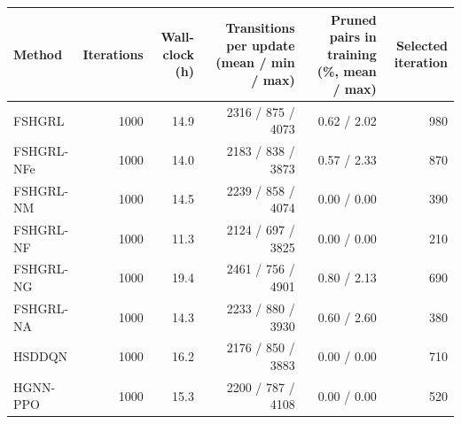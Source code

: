 \begin{tabular}{lrrrrr}
\toprule
Method & Iterations & Wall-clock (h) & Transitions per update (mean / min / max) & Pruned pairs in training (\%, mean / max) & Selected iteration \\
\midrule
FSHGRL & 1000 & 14.9 & 2316 / 875 / 4073 & 0.62 / 2.02 & 980 \\
FSHGRL-NFe & 1000 & 14.0 & 2183 / 838 / 3873 & 0.57 / 2.33 & 870 \\
FSHGRL-NM & 1000 & 14.5 & 2239 / 858 / 4074 & 0.00 / 0.00 & 390 \\
FSHGRL-NF & 1000 & 11.3 & 2124 / 697 / 3825 & 0.00 / 0.00 & 210 \\
FSHGRL-NG & 1000 & 19.4 & 2461 / 756 / 4901 & 0.80 / 2.13 & 690 \\
FSHGRL-NA & 1000 & 14.3 & 2233 / 880 / 3930 & 0.60 / 2.60 & 380 \\
HSDDQN & 1000 & 16.2 & 2176 / 850 / 3883 & 0.00 / 0.00 & 710 \\
HGNN-PPO & 1000 & 15.3 & 2200 / 787 / 4108 & 0.00 / 0.00 & 520 \\
\bottomrule
\end{tabular}
